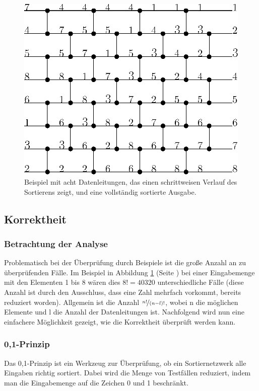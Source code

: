 \documentclass[11pt,ngerman]{article}
\begin{document}
\begin{figure}
\begin{center}
\includegraphics[scale=1]{bild2beispiel.eps}
\caption{Beispiel mit acht Datenleitungen, das einen schrittweisen Verlauf des Sortierens zeigt, und eine vollständig sortierte Ausgabe.}
\label{fig:kompnetnumbex}
\end{center}
\end{figure}
\subsection{Korrektheit}
\subsubsection{Betrachtung der Analyse}
Problematisch bei der Überprüfung durch Beispiele ist die große Anzahl an zu überprüfenden Fälle. Im Beispiel in Abbildung \ref{fig:kompnetnumbex} (Seite \pageref{fig:kompnetnumbex}) bei einer Eingabemenge mit den Elementen 1 bis 8 wären dies $8! = 40320$ unterschiedliche Fälle (diese Anzahl ist durch den Ausschluss, dass eine Zahl mehrfach vorkommt, bereits reduziert worden). Allgemein ist die Anzahl $\nicefrac{n!}{(n-l)!}$, wobei n die möglichen Elemente und l die Anzahl der Datenleitungen ist. Nachfolgend wird nun eine einfachere Möglichkeit gezeigt, wie die Korrektheit überprüft werden kann.
\subsubsection{0,1-Prinzip}
Das 0,1-Prinzip ist ein Werkzeug zur Überprüfung, ob ein Sortiernetzwerk alle Eingaben richtig sortiert. Dabei wird die Menge von Testfällen reduziert, indem man die Eingabemenge auf die Zeichen 0 und 1 beschränkt.
\end{document}
